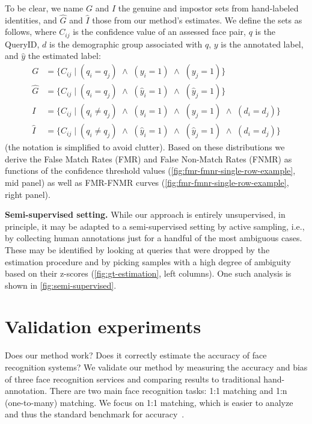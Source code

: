 \documentclass[10pt,twocolumn,letterpaper]{article}
\begin{document}
To be clear,  we name $G$ and $I$ the genuine and impostor sets from hand-labeled identities, and $\hat{G}$  and $\hat{I}$ those from our method's estimates. We define the sets as follows, where $C_{ij}$ is the confidence value of an assessed face pair, $q$ is the QueryID, $d$ is the demographic group associated with $q$, $y$ is the annotated label, and $\hat{y}$ the estimated label:
\begin{align*}
    G &= \{ C_{ij} \mid (q_i = q_j) \,\,\wedge \,\, (y_i = 1) \,\,\wedge \,\, (y_j = 1) \}\\
    \hat{G} &= \{ C_{ij} \mid (q_i = q_j) \,\,\wedge \,\, (\hat{y}_i = 1)  \,\, \wedge \,\,  (\hat{y}_j = 1) \}\\
    I &= \{ C_{ij} \mid (q_i \neq q_j) \,\,\wedge\,\,  (y_i = 1) \,\,\wedge\,\,  (y_j = 1) \,\,\wedge \,\, (d_i = d_j) \}\\
    \hat{I} &= \{ C_{ij}\mid (q_i \neq q_j) \,\,\wedge \,\,  (\hat{y}_i =1) \,\,\wedge \,\, (\hat{y}_j = 1) \,\,\wedge \,\,  (d_i = d_j) \}
\end{align*}
(the notation is simplified to avoid clutter). Based on these distributions we derive the False Match Rates (FMR) and False Non-Match Rates (FNMR) as functions of the confidence threshold values (\cref{fig:fmr-fmnr-single-row-example}, mid panel) as well as FMR-FNMR curves (\cref{fig:fmr-fmnr-single-row-example}, right panel).

\vspace{0.75mm}
\textbf{Semi-supervised setting.}
While our approach is entirely unsupervised, in principle, it may be adapted to a semi-supervised setting by active sampling, i.e., by collecting human annotations just for a handful of the most ambiguous cases. These may be identified by looking at queries that were dropped by the estimation procedure and by picking samples with a high degree of ambiguity based on their z-scores (\cref{fig:gt-estimation}, left columns). One such analysis is shown in \cref{fig:semi-supervised}.


\section{Validation experiments}
\label{sec:experiments}

Does our method work? Does it correctly estimate the accuracy of face recognition systems? We validate our method by measuring the accuracy and bias of three face recognition services and comparing results to traditional hand-annotation. There are two main face recognition tasks: 1:1 matching and 1:n (one-to-many) matching. We focus on 1:1 matching, which is easier to analyze and thus the standard benchmark for accuracy~\cite{albiero2020analysis,phillips2018face-b,grother2019face}.
\end{document}
